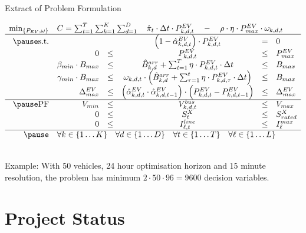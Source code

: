 \documentclass[handout]{beamer}
\makeatletter
\newenvironment{restoretext}%
{\@parboxrestore%
	\begin{adjustwidth}{-8mm}{-8mm}%
		\begin{lrbox}{\restorebox}%
			\begin{minipage}{\linewidth}%
			}{\end{minipage}\end{lrbox}
		\usebox\restorebox
	\end{adjustwidth}
}
\newcommand{\pev}{P^{EV}_{k,d,t}}
\newcommand{\pevc}{P^{EV}_{k,d,\tau}}
\newcommand{\pevb}{P^{EV}_{k,d,t-1}}
\newcommand{\aev}{\hat{\alpha}^{EV}_{k,d,t}}
\newcommand{\aevb}{\hat{\alpha}^{EV}_{k,d,t-1}}
\newcommand{\lev}{\omega_{k,d,t}}
\makeatother
\begin{document}
\begin{frame}{Extract of Problem Formulation}
	\begin{restoretext}
		\scriptsize
		\begingroup
		
		\renewcommand*{\arraystretch}{1.5}
		\begin{equation*}
		\begin{array}{rrccclcl}
		\min_{\{P_{EV},\omega\}} & \multicolumn{5}{l}{C=\sum_{t=1}^T \sum_{k=1}^{K} \sum_{d=1}^{D} \quad \hat{\pi}_t \cdot \Delta t \cdot \pev \quad - \quad \rho \cdot \eta \cdot P^{EV}_{max} \cdot \lev } \\ \hline \pause
		\text{s.t.} &&& \left(1-\aev\right)\cdot \pev & = & 0 \\
		& 0 & \leq & \pev & \leq & P^{EV}_{max} \\
		& \beta_{min}\cdot B_{max} & \leq &  \hat{B}^{arr}_{k,d}+\sum_{t=1}^{T} \eta \cdot \pev \cdot \Delta t & \leq & B_{max} \\
		& \gamma_{min} \cdot B_{max} & \leq & \lev \cdot \left(\hat{B}^{arr}_{k,d} + \sum_{\tau = 1}^{t} \eta \cdot \pevc \cdot \Delta t\right) & \leq & B_{max} \\	
		& \Delta^{EV}_{max} & \leq & \left(\aev\cdot\aevb\right)\cdot\left(\pev-\pevb\right)& \leq & \Delta^{EV}_{max}\\ \hline  \pause
		\text{PF} & V_{min} & \leq & V_{k,d,t}^{bus} & \leq & V_{max} \\
		& 0 & \leq & S_t^X & \leq & S^X_{rated} \\
		& 0 & \leq & I_{\ell,t}^{line} & \leq & I_{\ell}^{max} \\ \hline \pause
		& \multicolumn{5}{l}{\forall k\in \{1\dots K\} \quad \forall d\in \{1\dots D\} \quad \forall t\in \{1\dots T\} \quad \forall \ell\in \{1\dots L\}} \\
		\end{array}
		\end{equation*}
		\endgroup
		\normalsize
	\end{restoretext}
	~\\
	\small \textcolor{UOEred}{Example:} With 50 vehicles, 24 hour optimisation horizon and 15 minute resolution, the problem has minimum $2\cdot50\cdot96=9600$ decision variables.
	\normalsize
\end{frame}

\section{Project Status}
\end{document}
